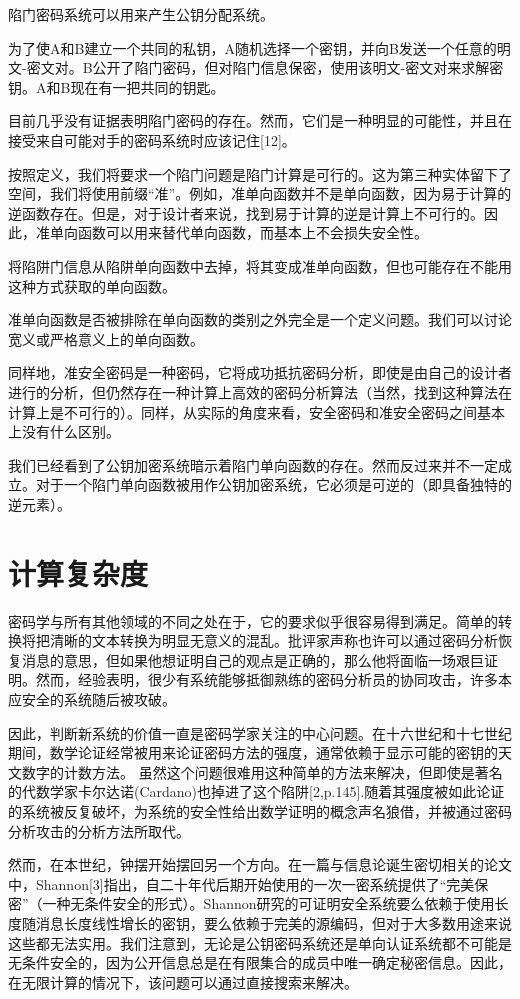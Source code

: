 \documentclass[]{article}
\begin{document}
	陷门密码系统可以用来产生公钥分配系统。
	
	为了使A和B建立一个共同的私钥，A随机选择一个密钥，并向B发送一个任意的明文-密文对。B公开了陷门密码，但对陷门信息保密，使用该明文-密文对来求解密钥。A和B现在有一把共同的钥匙。
	
	目前几乎没有证据表明陷门密码的存在。然而，它们是一种明显的可能性，并且在接受来自可能对手的密码系统时应该记住[12]。
	
	按照定义，我们将要求一个陷门问题是陷门计算是可行的。这为第三种实体留下了空间，我们将使用前缀“准”。例如，准单向函数并不是单向函数，因为易于计算的逆函数存在。但是，对于设计者来说，找到易于计算的逆是计算上不可行的。因此，准单向函数可以用来替代单向函数，而基本上不会损失安全性。
	
	将陷阱门信息从陷阱单向函数中去掉，将其变成准单向函数，但也可能存在不能用这种方式获取的单向函数。
	
	准单向函数是否被排除在单向函数的类别之外完全是一个定义问题。我们可以讨论宽义或严格意义上的单向函数。
	
	同样地，准安全密码是一种密码，它将成功抵抗密码分析，即使是由自己的设计者进行的分析，但仍然存在一种计算上高效的密码分析算法（当然，找到这种算法在计算上是不可行的）。同样，从实际的角度来看，安全密码和准安全密码之间基本上没有什么区别。
	
	我们已经看到了公钥加密系统暗示着陷门单向函数的存在。然而反过来并不一定成立。对于一个陷门单向函数被用作公钥加密系统，它必须是可逆的（即具备独特的逆元素）。
	
	\section{计算复杂度}
	
	密码学与所有其他领域的不同之处在于，它的要求似乎很容易得到满足。简单的转换将把清晰的文本转换为明显无意义的混乱。批评家声称也许可以通过密码分析恢复消息的意思，但如果他想证明自己的观点是正确的，那么他将面临一场艰巨证明。然而，经验表明，很少有系统能够抵御熟练的密码分析员的协同攻击，许多本应安全的系统随后被攻破。
	
	因此，判断新系统的价值一直是密码学家关注的中心问题。在十六世纪和十七世纪期间，数学论证经常被用来论证密码方法的强度，通常依赖于显示可能的密钥的天文数字的计数方法。
	虽然这个问题很难用这种简单的方法来解决，但即使是著名的代数学家卡尔达诺(Cardano)也掉进了这个陷阱[2,p.145].随着其强度被如此论证的系统被反复破坏，为系统的安全性给出数学证明的概念声名狼借，并被通过密码分析攻击的分析方法所取代。
	
	
	然而，在本世纪，钟摆开始摆回另一个方向。在一篇与信息论诞生密切相关的论文中，Shannon[3]指出，自二十年代后期开始使用的一次一密系统提供了“完美保密”（一种无条件安全的形式）。Shannon研究的可证明安全系统要么依赖于使用长度随消息长度线性增长的密钥，要么依赖于完美的源编码，但对于大多数用途来说这些都无法实用。我们注意到，无论是公钥密码系统还是单向认证系统都不可能是无条件安全的，因为公开信息总是在有限集合的成员中唯一确定秘密信息。因此，在无限计算的情况下，该问题可以通过直接搜索来解决。
	
\end{document}
